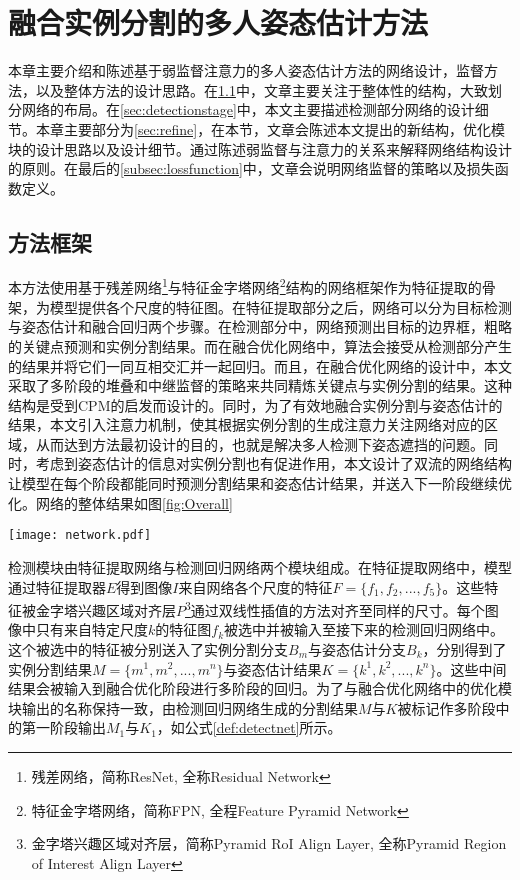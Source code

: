 \chapter{融合实例分割的多人姿态估计方法}
\label{cha:method}
本章主要介绍和陈述基于弱监督注意力的多人姿态估计方法的网络设计，监督方法，以及整体方法的设计思路。在\ref{sec:methodoverview}中，文章主要关注于整体性的结构，大致划分网络的布局。在\ref{sec:detectionstage}中，本文主要描述检测部分网络的设计细节。本章主要部分为\ref{sec:refine}，在本节，文章会陈述本文提出的新结构，优化模块的设计思路以及设计细节。通过陈述弱监督与注意力的关系来解释网络结构设计的原则。在最后的\ref{subsec:lossfunction}中，文章会说明网络监督的策略以及损失函数定义。

\section{方法框架}
\label{sec:methodoverview}
本方法使用基于残差网络\footnote{残差网络，简称ResNet, 全称Residual Network}与特征金字塔网络\footnote{特征金字塔网络，简称FPN, 全程Feature Pyramid Network}结构的网络框架作为特征提取的骨架，为模型提供各个尺度的特征图。在特征提取部分之后，网络可以分为目标检测与姿态估计和融合回归两个步骤。在检测部分中，网络预测出目标的边界框，粗略的关键点预测和实例分割结果。而在融合优化网络中，算法会接受从检测部分产生的结果并将它们一同互相交汇并一起回归。而且，在融合优化网络的设计中，本文采取了多阶段的堆叠和中继监督的策略来共同精炼关键点与实例分割的结果。这种结构是受到CPM\cite{wei2016convolutional}的启发而设计的。同时，为了有效地融合实例分割与姿态估计的结果，本文引入注意力机制，使其根据实例分割的生成注意力关注网络对应的区域，从而达到方法最初设计的目的，也就是解决多人检测下姿态遮挡的问题。同时，考虑到姿态估计的信息对实例分割也有促进作用，本文设计了双流的网络结构让模型在每个阶段都能同时预测分割结果和姿态估计结果，并送入下一阶段继续优化。网络的整体结果如图\ref{fig:Overall}

\begin{figure*}[htbp]	
	\centering
	\texttt{[image: network.pdf]}
	\caption{网络整体结构}
	\label{fig:Overall}
\end{figure*}

检测模块由特征提取网络与检测回归网络两个模块组成。在特征提取网络中，模型通过特征提取器$E$得到图像$I$来自网络各个尺度的特征$F=\{f_1, f_2, ..., f_5\}$。这些特征被金字塔兴趣区域对齐层$P$\footnote{金字塔兴趣区域对齐层，简称Pyramid RoI Align Layer, 全称Pyramid Region of Interest Align Layer}通过双线性插值的方法对齐至同样的尺寸。每个图像中只有来自特定尺度$k$的特征图$f_k$被选中并被输入至接下来的检测回归网络中。这个被选中的特征被分别送入了实例分割分支$B_m$与姿态估计分支$B_k$，分别得到了实例分割结果$M=\{m^1, m^2, ..., m^n\}$与姿态估计结果$K=\{k^1, k^2, ..., k^n\}$。这些中间结果会被输入到融合优化阶段进行多阶段的回归。为了与融合优化网络中的优化模块输出的名称保持一致，由检测回归网络生成的分割结果$M$与$K$被标记作多阶段中的第一阶段输出$M_1$与$K_1$，如公式\eqref{def:detectnet}所示。

